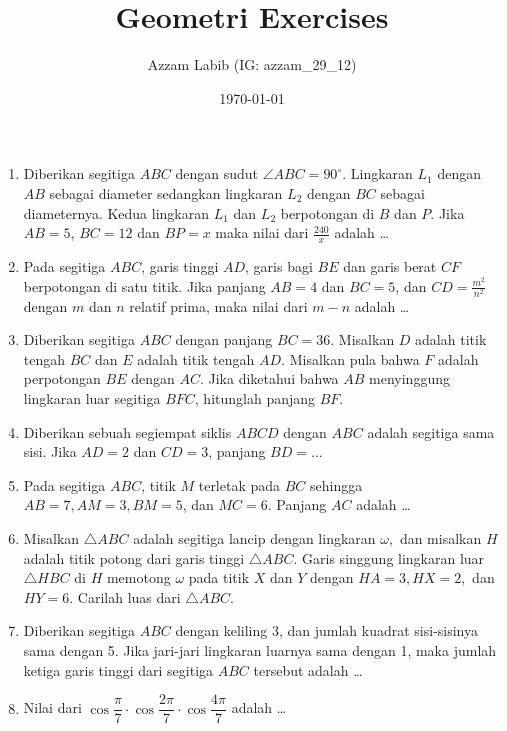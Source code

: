 \documentclass[12pt]{scrartcl}
\title{Geometri Exercises}
\author{Azzam Labib (IG: azzam\_29\_12)}
\date{\today}
\begin{document}
\maketitle

\begin{enumerate}
    \item Diberikan segitiga $ABC$ dengan sudut $\angle ABC = 90^\circ$. Lingkaran $L_1$ dengan $AB$ sebagai diameter sedangkan lingkaran $L_2$ dengan $BC$ sebagai diameternya. Kedua lingkaran $L_1$ dan $L_2$ berpotongan di $B$ dan $P$. Jika $AB = 5$, $BC = 12$ dan $BP = x$ maka nilai dari $\frac{240}{x}$ adalah \ldots
    
    \item Pada segitiga $ABC$, garis tinggi $AD$, garis bagi $BE$ dan garis berat $CF$ berpotongan di satu titik. Jika panjang $AB = 4$ dan $BC = 5$, dan $CD = \frac{m^2}{n^2}$ dengan $m$ dan $n$ relatif prima, maka nilai dari $m - n$ adalah \ldots

    \item Diberikan segitiga $ABC$ dengan panjang $BC = 36$. Misalkan $D$ adalah titik tengah $BC$ dan $E$ adalah titik tengah $AD$. Misalkan pula bahwa $F$ adalah perpotongan $BE$ dengan $AC$. Jika diketahui bahwa $AB$ menyinggung lingkaran luar segitiga $BFC$, hitunglah panjang $BF$.

    \item Diberikan sebuah segiempat siklis $ABCD$ dengan $ABC$ adalah segitiga sama sisi. Jika $AD=2$ dan $CD=3$, panjang $BD=\dots$

    \item Pada segitiga $ABC$, titik $M$ terletak pada $BC$ sehingga $AB=7, AM=3, BM=5$, dan $MC=6$. Panjang $AC$ adalah \dots

    \item Misalkan $\triangle ABC$ adalah segitiga lancip dengan lingkaran $\omega,$ dan misalkan $H$ adalah titik potong dari garis tinggi $\triangle ABC.$ Garis singgung lingkaran luar $\triangle HBC$ di $H$ memotong $\omega$ pada titik $X$ dan $Y$ dengan $HA=3,HX=2,$ dan $HY=6.$ Carilah luas dari $\triangle ABC$.

    \item Diberikan segitiga $ABC$ dengan keliling 3, dan jumlah kuadrat sisi-sisinya sama dengan 5. Jika jari-jari lingkaran luarnya sama dengan 1, maka jumlah ketiga garis tinggi dari segitiga $ABC$ tersebut adalah \dots

    \item Nilai dari $\cos \dfrac{\pi}{7}\cdot \cos \dfrac{2\pi}{7} \cdot \cos \dfrac{4\pi}{7}$ adalah \dots


\end{enumerate}
\end{document}

